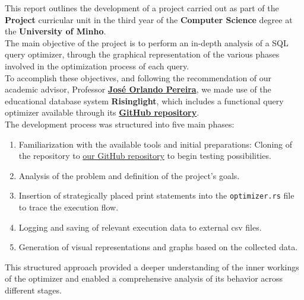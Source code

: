 \documentclass[a4paper,12pt]{scrreprt}
\begin{document}

\makecover 
{}


\renewenvironment{abstract}
 {\par\noindent\textbf{\Large\abstractname}\par\bigskip}
 {}

\begin{abstract}
This report outlines the development of a project carried out as part of the \textbf{Project} curricular unit in the third year of the \textbf{Computer Science} degree at the \textbf{University of Minho}. \\

The main objective of the project is to perform an in-depth analysis of a SQL query optimizer, through the graphical representation of the various phases involved in the optimization process of each query. \\

To accomplish these objectives, and following the recommendation of our academic advisor, Professor \textbf{\href{https://jopereira.github.io}{José Orlando Pereira}}, we made use of the educational database system \textbf{Risinglight}, which includes a functional query optimizer available through its \textbf{\href{https://github.com/risinglightdb/risinglight}{GitHub repository}}. \\

The development process was structured into five main phases:
\begin{enumerate}
    \item Familiarization with the available tools and initial preparations: Cloning of the repository to \href{https://github.com/Blackparkd/risinglight}{our GitHub repository} to begin testing possibilities.
    \item Analysis of the problem and definition of the project's goals.
    \item Insertion of strategically placed print statements into the \texttt{optimizer.rs} file to trace the execution flow.
    \item Logging and saving of relevant execution data to external csv files.
    \item Generation of visual representations and graphs based on the collected data.
\end{enumerate}

This structured approach provided a deeper understanding of the inner workings of the optimizer and enabled a comprehensive analysis of its behavior across different stages.
\end{abstract}
\end{document}
